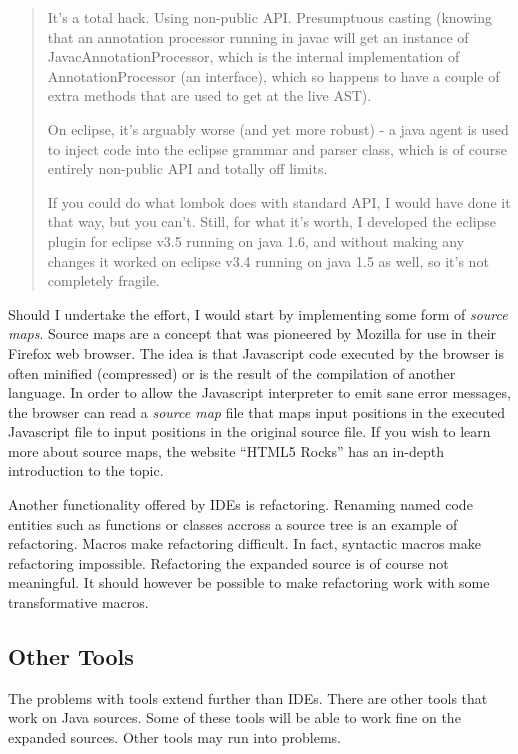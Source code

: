 \begin{quote}
  It's a total hack. Using non-public API. Presumptuous casting (knowing that an
  annotation processor running in javac will get an instance of
  JavacAnnotationProcessor, which is the internal implementation of
  AnnotationProcessor (an interface), which so happens to have a couple of extra
  methods that are used to get at the live AST).

  On eclipse, it's arguably worse (and yet more robust) - a java agent is used
  to inject code into the eclipse grammar and parser class, which is of course
  entirely non-public API and totally off limits.

  If you could do what lombok does with standard API, I would have done it that
  way, but you can't. Still, for what it's worth, I developed the eclipse plugin
  for eclipse v3.5 running on java 1.6, and without making any changes it worked
  on eclipse v3.4 running on java 1.5 as well, so it's not completely fragile.
\end{quote}

Should I undertake the effort, I would start by implementing some form of
\emph{source maps}. Source maps are a concept that was pioneered by Mozilla
\cite{source_maps_home} for use in their Firefox web browser. The idea is that
Javascript code executed by the browser is often minified (compressed) or is the
result of the compilation of another language. In order to allow the Javascript
interpreter to emit sane error messages, the browser can read a \emph{source
  map} file that maps input positions in the executed Javascript file to input
positions in the original source file. If you wish to learn more about source
maps, the website ``HTML5 Rocks'' has an in-depth introduction to the
topic. \cite{source_maps_expl}

Another functionality offered by IDEs is refactoring. Renaming named code
entities such as functions or classes accross a source tree is an example of
refactoring. Macros make refactoring difficult. In fact, syntactic macros make
refactoring impossible. Refactoring the expanded source is of course not
meaningful. It should however be possible to make refactoring work with some
transformative macros.

\subsection{Other Tools}

The problems with tools extend further than IDEs. There are other tools that
work on Java sources. Some of these tools will be able to work fine on the
expanded sources. Other tools may run into problems.

